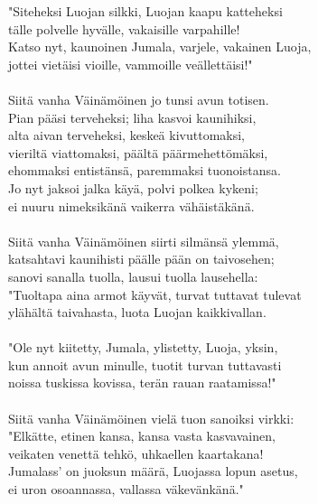 "Siteheksi Luojan silkki, Luojan kaapu katteheksi                      \\
tälle polvelle hyvälle, vakaisille varpahille!                         \\
Katso nyt, kaunoinen Jumala, varjele, vakainen Luoja,                  \\
jottei vietäisi vioille, vammoille veällettäisi!"                      \\
                                                                       \\
Siitä vanha Väinämöinen jo tunsi avun totisen.                         \\
Pian pääsi terveheksi; liha kasvoi kaunihiksi,                         \\
alta aivan terveheksi, keskeä kivuttomaksi,                            \\
vieriltä viattomaksi, päältä päärmehettömäksi,                         \\
ehommaksi entistänsä, paremmaksi tuonoistansa.                         \\
Jo nyt jaksoi jalka käyä, polvi polkea kykeni;                         \\
ei nuuru nimeksikänä vaikerra vähäistäkänä.                            \\
                                                                       \\
Siitä vanha Väinämöinen siirti silmänsä ylemmä,                        \\
katsahtavi kaunihisti päälle pään on taivosehen;                       \\
sanovi sanalla tuolla, lausui tuolla lausehella:                       \\
"Tuoltapa aina armot käyvät, turvat tuttavat tulevat                   \\
ylähältä taivahasta, luota Luojan kaikkivallan.                        \\
                                                                       \\
"Ole nyt kiitetty, Jumala, ylistetty, Luoja, yksin,                    \\
kun annoit avun minulle, tuotit turvan tuttavasti                      \\
noissa tuskissa kovissa, terän rauan raatamissa!"                      \\
                                                                       \\
Siitä vanha Väinämöinen vielä tuon sanoiksi virkki:                    \\
"Elkätte, etinen kansa, kansa vasta kasvavainen,                       \\
veikaten venettä tehkö, uhkaellen kaartakana!                          \\
Jumalass' on juoksun määrä, Luojassa lopun asetus,                     \\
ei uron osoannassa, vallassa väkevänkänä."                             \\